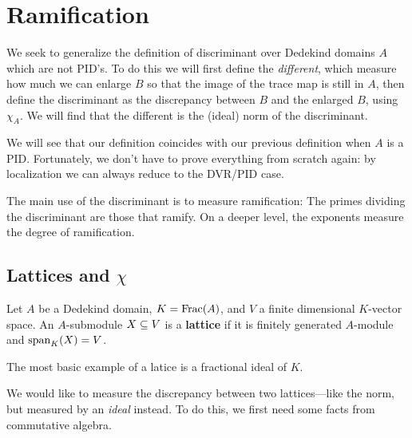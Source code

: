 
\chapter{Ramification}
We seek to generalize the definition of discriminant over Dedekind domains $A$ which are not PID's. To do this we will first define the {\it different}, which measure how much we can enlarge $B$ so that the image of the trace map is still in $A$, then define the discriminant as the discrepancy between $B$ and the enlarged $B$, using $\chi_A$. We will find that the different is the (ideal) norm of the discriminant.

We will see that our definition coincides with our previous definition when $A$ is a PID. Fortunately, we don't have to prove everything from scratch again: by localization we can always reduce to the DVR/PID case.

The main use of the discriminant is to measure ramification: The primes dividing the discriminant are those that ramify. On a deeper level, the exponents measure the degree of ramification.
\section{Lattices and $\chi$}
\begin{df}
Let $A$ be a Dedekind domain, $K=\operatorname{Frac}(A)$, and $V$ a finite dimensional $K$-vector space. An $A$-submodule $X\subseteq V$ is a \textbf{lattice} if it is finitely generated $A$-module and $\operatorname{span}_K(X)=V$.
\end{df}
The most basic example of a latice is a fractional ideal of $K$.

We would like to measure the discrepancy between two lattices---like the norm, but measured by an {\it ideal} instead. To do this, we first need some facts from commutative algebra.
